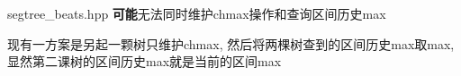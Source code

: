 segtree_beats.hpp   \textbf{可能}无法同时维护chmax操作和查询区间历史max

现有一方案是另起一颗树只维护chmax, 然后将两棵树查到的区间历史max取max, 显然第二课树的区间历史max就是当前的区间max